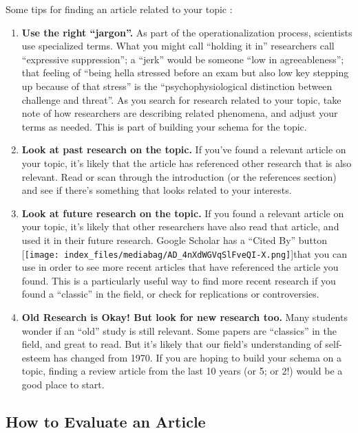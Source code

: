 \documentclass[
  letterpaper,
  DIV=11,
  numbers=noendperiod,
  oneside]{scrreprt}
\begin{document}
Some tips for finding an article related to your topic :~

\begin{enumerate}
\def\labelenumi{\arabic{enumi}.}
\item
  \textbf{Use the right ``jargon''.} As part of the operationalization
  process, scientists use specialized terms. What you might call
  ``holding it in'' researchers call ``expressive suppression''; a
  ``jerk'' would be someone ``low in agreeableness''; that feeling of
  ``being hella stressed before an exam but also low key stepping up
  because of that stress'' is the ``psychophysiological distinction
  between challenge and threat''. As you search for research related to
  your topic, take note of how researchers are describing related
  phenomena, and adjust your terms as needed. This is part of building
  your schema for the topic.
\item
  \textbf{Look at past research on the topic.} If you've found a
  relevant article on your topic, it's likely that the article has
  referenced other research that is also relevant. Read or scan through
  the introduction (or the references section) and see if there's
  something that looks related to your interests.
\item
  \textbf{Look at future research on the topic.} If you found a relevant
  article on your topic, it's likely that other researchers have also
  read that article, and used it in their future research. Google
  Scholar has a ``Cited By'' button
  {[}\texttt{[image: index\_files/mediabag/AD\_4nXdWGVqSlFveQI-X.png]}{]}that
  you can use in order to see more recent articles that have referenced
  the article you found. This is a particularly useful way to find more
  recent research if you found a ``classic'' in the field, or check for
  replications or controversies.
\item
  \textbf{Old Research is Okay! But look for new research too.} Many
  students wonder if an ``old'' study is still relevant. Some papers are
  ``classics'' in the field, and great to read. But it's likely that our
  field's understanding of self-esteem has changed from 1970. If you are
  hoping to build your schema on a topic, finding a review article from
  the last 10 years (or 5; or 2!) would be a good place to start.
\end{enumerate}

\subsection{How to Evaluate an
Article}\label{how-to-evaluate-an-article}
\end{document}
